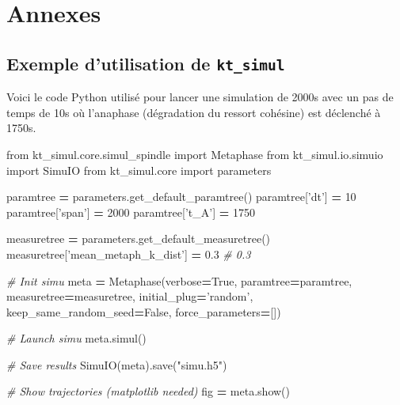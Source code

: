 \documentclass[12pt,a4paper,twoside,openright]{book}
\newenvironment{Shaded}{\begin{snugshade}}{\end{snugshade}}
\newcommand{\DecValTok}[1]{\textcolor[rgb]{0.00,0.00,0.81}{{#1}}}
\newcommand{\FloatTok}[1]{\textcolor[rgb]{0.00,0.00,0.81}{{#1}}}
\newcommand{\StringTok}[1]{\textcolor[rgb]{0.31,0.60,0.02}{{#1}}}
\newcommand{\ImportTok}[1]{{#1}}
\newcommand{\CommentTok}[1]{\textcolor[rgb]{0.56,0.35,0.01}{\textit{{#1}}}}
\newcommand{\VariableTok}[1]{\textcolor[rgb]{0.00,0.00,0.00}{{#1}}}
\newcommand{\OperatorTok}[1]{\textcolor[rgb]{0.81,0.36,0.00}{\textbf{{#1}}}}
\newcommand{\NormalTok}[1]{{#1}}
\begin{document}
\chapter{Annexes}\label{annexes}

\section{\texorpdfstring{Exemple d'utilisation de
\texttt{kt\_simul}}{Exemple d'utilisation de kt\_simul}}\label{exemple-dutilisation-de-ktux5fsimul}

\label{sec:ktsimul}

Voici le code Python utilisé pour lancer une simulation de 2000s avec un
pas de temps de 10s où l'anaphase (dégradation du ressort cohésine) est
déclenché à 1750s.

\begin{Shaded}
\begin{Highlighting}[]
\ImportTok{from} \NormalTok{kt_simul.core.simul_spindle }\ImportTok{import} \NormalTok{Metaphase}
\ImportTok{from} \NormalTok{kt_simul.io.simuio }\ImportTok{import} \NormalTok{SimuIO}
\ImportTok{from} \NormalTok{kt_simul.core }\ImportTok{import} \NormalTok{parameters}

\NormalTok{paramtree }\OperatorTok{=} \NormalTok{parameters.get_default_paramtree()}
\NormalTok{paramtree[}\StringTok{'dt'}\NormalTok{] }\OperatorTok{=} \DecValTok{10}
\NormalTok{paramtree[}\StringTok{'span'}\NormalTok{] }\OperatorTok{=} \DecValTok{2000}
\NormalTok{paramtree[}\StringTok{'t_A'}\NormalTok{] }\OperatorTok{=} \DecValTok{1750}

\NormalTok{measuretree }\OperatorTok{=} \NormalTok{parameters.get_default_measuretree()}
\NormalTok{measuretree[}\StringTok{'mean_metaph_k_dist'}\NormalTok{] }\OperatorTok{=} \FloatTok{0.3}  \CommentTok{# 0.3}

\CommentTok{# Init simu}
\NormalTok{meta }\OperatorTok{=} \NormalTok{Metaphase(verbose}\OperatorTok{=}\VariableTok{True}\NormalTok{,}
                 \NormalTok{paramtree}\OperatorTok{=}\NormalTok{paramtree,}
                 \NormalTok{measuretree}\OperatorTok{=}\NormalTok{measuretree,}
                 \NormalTok{initial_plug}\OperatorTok{=}\StringTok{'random'}\NormalTok{,}
                 \NormalTok{keep_same_random_seed}\OperatorTok{=}\VariableTok{False}\NormalTok{,}
                 \NormalTok{force_parameters}\OperatorTok{=}\NormalTok{[])}

\CommentTok{# Launch simu}
\NormalTok{meta.simul()}

\CommentTok{# Save results}
\NormalTok{SimuIO(meta).save(}\StringTok{"simu.h5"}\NormalTok{)}

\CommentTok{# Show trajectories (matplotlib needed)}
\NormalTok{fig }\OperatorTok{=} \NormalTok{meta.show()}
\end{Highlighting}
\end{Shaded}
\end{document}
